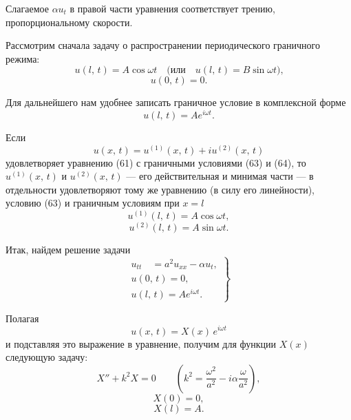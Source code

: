 \documentclass{article}
\begin{document}
\setcounter{page}{107}
\thispagestyle{fancy}
\fancyhf{}
\fancyhead[L]{§ 3]}
\renewcommand{\headrulewidth}{0pt}

Слагаемое $\alpha u_t$ в правой части уравнения соответствует трению, пропорциональному скорости.

Рассмотрим сначала задачу о распространении периодического граничного режима:
\begin{equation*}
u(l,\,t) = A\cos\omega t \quad \text{(или} \quad u(l,\,t) = B\sin\omega t\text{),} \tag{62}
\end{equation*}
\begin{equation*}
u(0,\,t) = 0. \tag{63}
\end{equation*}

Для дальнейшего нам удобнее записать граничное условие в комплексной форме
\begin{equation*}
u(l,\,t) = Ae^{i\omega t}. \tag{64}
\end{equation*}

Если
\begin{equation*}
u(x,\,t) = u^{(1)}(x,\,t) + iu^{(2)}(x,\,t)
\end{equation*}
удовлетворяет уравнению (61) с граничными условиями (63) и (64), то $u^{(1)}(x,\,t)$ и $u^{(2)}(x,\,t)$ — его действительная и минимая части — в отдельности удовлетворяют тому же уравнению (в силу его линейности), условию (63) и граничным условиям при $x = l$
\begin{equation*}
u^{(1)}(l,\,t) = A\cos\omega t,
\end{equation*}
\begin{equation*}
u^{(2)}(l,\,t) = A\sin\omega t.
\end{equation*}

Итак, найдем решение задачи
\begin{equation*}
\left.
\begin{array}{l}
u_{tt} \quad = a^{2}u_{xx} - \alpha u_t, \\
u(0,\,t) = 0, \\
u(l,\,t) = Ae^{i\omega t}.
\end{array}
\right\} \tag{65}
\end{equation*}

Полагая
\begin{equation*}
u(x,\,t) = X(x)\,e^{i\omega t}
\end{equation*}
и подставляя это выражение в уравнение, получим для функции $X(x)$ следующую задачу:
\begin{equation*}
X'' + k^{2}X = 0 \qquad \left(k^{2} = \frac{\omega^{2}}{a^{2}} - i\alpha\frac{\omega}{a^{2}}\right), \tag{66}
\end{equation*}
\begin{equation*}
X(0) = 0, \tag{67}
\end{equation*}
\begin{equation*}
X(l) = A. \tag{68}
\end{equation*}
\end{document}
